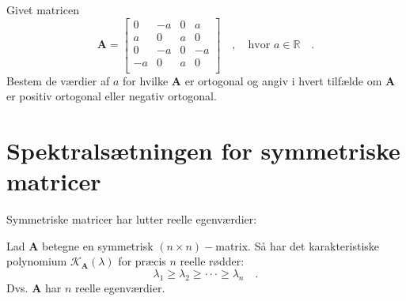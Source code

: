 \begin{exercise} \label{exercLA8.24}
Givet matricen
\begin{equation}
\mathbf{A} = \left[
           \begin{array}{rrrr}
             0 & -a & 0 & a \\
             a & 0 & a & 0\\
             0 & -a & 0 & -a \\
             -a & 0 & a & 0 \\
           \end{array}
         \right] \quad , \quad \textrm{hvor $a \in \mathbb{R}$} \quad .
\end{equation}
Bestem de værdier af $a$ for hvilke $\mathbf{A}$ er ortogonal og angiv i hvert tilfælde om $\mathbf{A}$ er positiv ortogonal eller negativ ortogonal.
\end{exercise}




\section{Spektralsætningen for symmetriske matricer} \label{secSpektral}

Symmetriske matricer har lutter reelle egenværdier:

\begin{theorem} \label{thmSymReel}
Lad $\mathbf{A}$ betegne en symmetrisk $(n \times n)-$matrix. Så har det karakteristiske polynomium $\mathcal{K}_{\mathbf{A}}(\lambda)$ for
præcis $n$ reelle rødder:
\begin{equation}
\lambda_{1} \geq \lambda_{2} \geq \cdot \cdot \cdot \geq \lambda_{n} \quad.
\end{equation}
Dvs. $\mathbf{A}$ har $n$ reelle egenværdier.
\end{theorem}

